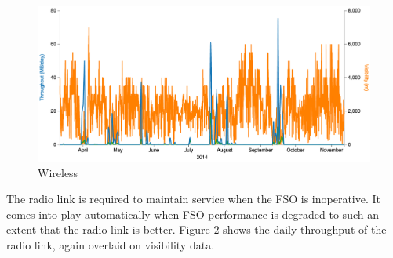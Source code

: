 \documentclass{amsart}
\begin{document}
\begin{figure}
  \centering
  \includegraphics[width=\textwidth]{results/fig2-Wireless-12-Apr-12-Nov}
  \caption{Wireless}
  \label{fig:throughput_wireless}
\end{figure}
The radio link is required to maintain service when the FSO is
inoperative. It comes into play automatically when FSO performance is
degraded to such an extent that the radio link is better. Figure 2
shows the daily throughput of the radio link, again overlaid on
visibility data.
\end{document}
